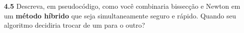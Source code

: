 \documentclass[
	12pt,				%
	openright,			%
	a4paper,			%
	english,			%
	french,				%
	spanish,			%
	brazil,				%
	]{abntex2}
\begin{document}
\textbf{4.5} Descreva, em pseudocódigo, como você combinaria bissecção e Newton em um \textbf{método híbrido} que seja simultaneamente seguro e rápido. Quando seu algoritmo decidiria trocar de um para o outro?



\postextual






% 













\printindex
\end{document}
